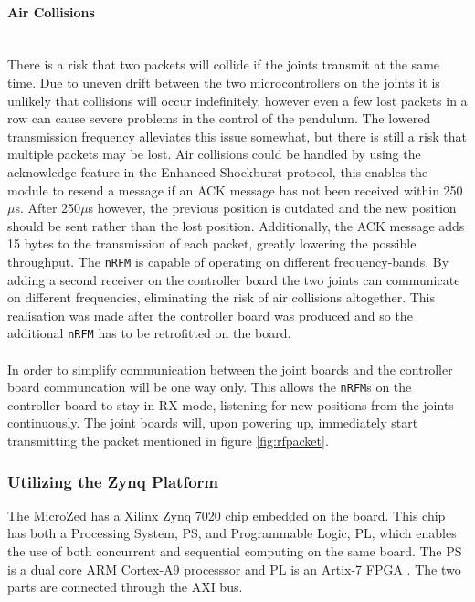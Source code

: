 \paragraph{Air Collisions}~\\
\label{par:air_collisions}
There is a risk that two packets will collide if the joints transmit at the same time.
Due to uneven drift between the two microcontrollers on the joints it is unlikely that collisions will occur indefinitely, however even a few lost packets in a row can cause severe problems in the control of the pendulum.
The lowered transmission frequency alleviates this issue somewhat, but there is still a risk that multiple packets may be lost.
Air collisions could be handled by using the acknowledge feature in the Enhanced Shockburst protocol, this enables the module to resend a message if an ACK message has not been received within 250$\mu$s.
After 250$\mu$s however, the previous position is outdated and the new position should be sent rather than the lost position.
Additionally, the ACK message adds 15 bytes to the transmission of each packet, greatly lowering the possible throughput.
The \texttt{nRFM} is capable of operating on different frequency-bands.
By adding a second receiver on the controller board the two joints can communicate on different frequencies, eliminating the risk of air collisions altogether.
This realisation was made after the controller board was produced and so the additional \texttt{nRFM} has to be retrofitted on the board. 
\\~\\
In order to simplify communication between the joint boards and the controller board communcation will be one way only.
This allows the \texttt{nRFM}s on the controller board to stay in RX-mode, listening for new positions from the joints continuously.
The joint boards will, upon powering up, immediately start transmitting the packet mentioned in figure \ref{fig:rfpacket}.

\subsubsection{Utilizing the Zynq Platform} %
\label{ssub:utializing_the_zynq_platform}
The MicroZed has a Xilinx Zynq 7020 chip embedded on the board. 
This chip has both a Processing System, PS, and Programmable Logic, PL, which enables the use of both concurrent and sequential computing on the same board. 
The PS is a dual core ARM Cortex-A9 processsor and PL is an Artix-7 FPGA \cite{zynq_data_sheet}.
The two parts are connected through the AXI bus.

